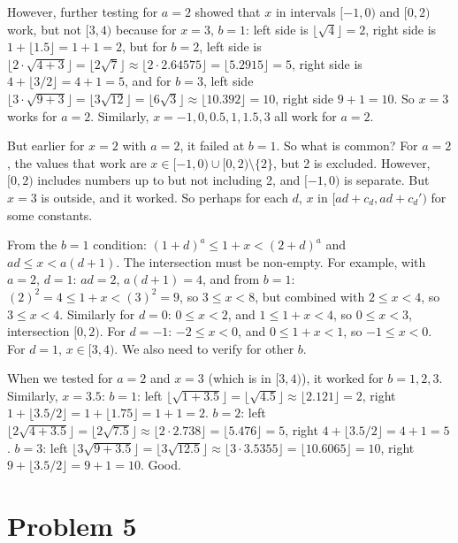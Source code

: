 \documentclass[12pt,a4paper]{article}
\theoremstyle{definition}
\begin{document}
        However, further testing for $a=2$ showed that $x$ in intervals $[-1,0)$ and $[0,2)$ work, but not $[3,4)$ because for $x=3$, $b=1$: left side is $\lfloor \sqrt{4} \rfloor = 2$, right side is $1 + \lfloor 1.5 \rfloor = 1 + 1 = 2$, but for $b=2$, left side is $\lfloor 2 \cdot \sqrt{4+3} \rfloor = \lfloor 2\sqrt{7} \rfloor \approx \lfloor 2 \cdot 2.64575 \rfloor = \lfloor 5.2915 \rfloor = 5$, right side is $4 + \lfloor 3/2 \rfloor = 4 + 1 = 5$, and for $b=3$, left side $\lfloor 3 \cdot \sqrt{9+3} \rfloor = \lfloor 3\sqrt{12} \rfloor = \lfloor 6\sqrt{3} \rfloor \approx \lfloor 10.392 \rfloor = 10$, right side $9 + 1 = 10$. So $x=3$ works for $a=2$. Similarly, $x=-1,0,0.5,1,1.5,3$ all work for $a=2$.

        But earlier for $x=2$ with $a=2$, it failed at $b=1$. So what is common? For $a=2$, the values that work are $x \in [-1,0) \cup [0,2) \setminus \{2\}$, but 2 is excluded. However, $[0,2)$ includes numbers up to but not including 2, and $[-1,0)$ is separate. But $x=3$ is outside, and it worked. So perhaps for each $d$, $x$ in $[ad + c_d, ad + c_d')$ for some constants.

        From the $b=1$ condition: $(1+d)^a \leq 1+x < (2+d)^a$ and $ad \leq x < a(d+1)$. The intersection must be non-empty. For example, with $a=2$, $d=1$: $ad = 2$, $a(d+1)=4$, and from $b=1$: $(2)^2 = 4 \leq 1+x < (3)^2=9$, so $3 \leq x <8$, but combined with $2 \leq x <4$, so $3 \leq x <4$. Similarly for $d=0$: $0 \leq x <2$, and $1 \leq 1+x <4$, so $0 \leq x <3$, intersection $[0,2)$. For $d=-1$: $-2 \leq x <0$, and $0 \leq 1+x <1$, so $-1 \leq x <0$. For $d=1$, $x \in [3,4)$. We also need to verify for other $b$.

        When we tested for $a=2$ and $x=3$ (which is in $[3,4)$), it worked for $b=1,2,3$. Similarly, $x=3.5$: $b=1$: left $\lfloor \sqrt{1+3.5} \rfloor = \lfloor \sqrt{4.5} \rfloor \approx \lfloor 2.121 \rfloor =2$, right $1 + \lfloor 3.5/2 \rfloor =1 + \lfloor 1.75 \rfloor =1+1=2$. $b=2$: left $\lfloor 2 \sqrt{4+3.5} \rfloor = \lfloor 2\sqrt{7.5} \rfloor \approx \lfloor 2 \cdot 2.738 \rfloor = \lfloor 5.476 \rfloor =5$, right $4 + \lfloor 3.5/2 \rfloor =4+1=5$. $b=3$: left $\lfloor 3 \sqrt{9+3.5} \rfloor = \lfloor 3\sqrt{12.5} \rfloor \approx \lfloor 3 \cdot 3.5355 \rfloor = \lfloor 10.6065 \rfloor =10$, right $9 + \lfloor 3.5/2 \rfloor =9+1=10$. Good.

\section{Problem 5}
\end{document}
